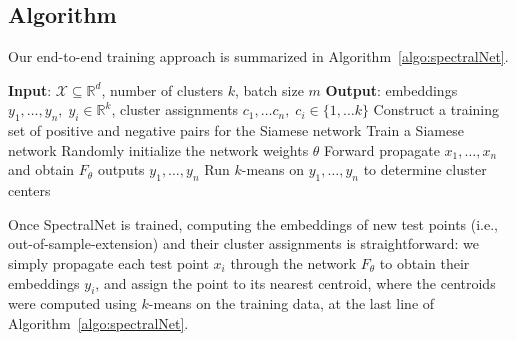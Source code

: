 \documentclass{article} %
\begin{document}

\subsection {Algorithm}  \label{sec:algorithm}
Our end-to-end training approach is summarized in Algorithm~\ref{algo:spectralNet}.

\begin{algorithm}[H]
 {\bf Input}{: $\mathcal{X} \subseteq \mathbb{R}^d$, number of clusters $k$, batch size $m$}\;
 {\bf Output}: embeddings $y_1,\ldots, y_n,\; y_i \in \mathbb{R}^k$, cluster assignments $c_1,\ldots c_n,\; c_i \in \{1,\ldots k\}$
 Construct a training set of positive and negative pairs for the Siamese network\;
 Train a Siamese network\;
 Randomly initialize the network weights $\theta$\;
 Forward propagate $x_1,\ldots, x_n$ and obtain $F_\theta$ outputs $y_1,\ldots, y_n$\;
 Run $k$-means on $y_1,\ldots, y_n$ to determine cluster centers\;

 \caption{SpectralNet training}
 \label{algo:spectralNet}
\end{algorithm}


Once SpectralNet is trained, computing the embeddings of new test points (i.e., out-of-sample-extension) and their cluster assignments is straightforward: we simply propagate each test point $x_i$ through the network $F_\theta$ to obtain their embeddings $y_i$, and assign the point to its nearest centroid, where the centroids were computed using $k$-means on the training data, at the last line of Algorithm~\ref{algo:spectralNet}.


\end{document}
